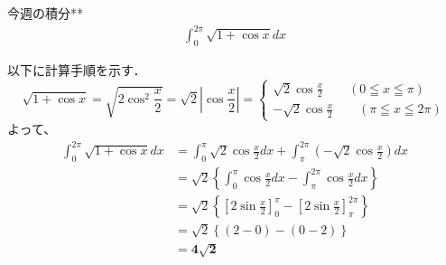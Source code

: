 \documentclass[main]{subfiles}
\begin{document}

\begin{mondai}{2}{今週の積分}{**}
    \begin{align*}
        \int_0^{2\pi} \sqrt{1+\cos x} dx
    \end{align*}
\end{mondai}


\solutionhead
\hfill
以下に計算手順を示す．
\hfill\
\begin{equation*}
    \sqrt{1+\cos x} = \sqrt{2\cos ^2 \frac{x}{2}} = \sqrt{2}\left| \cos \frac{x}{2} \right| = 
    \begin{cases}
        \sqrt{2} \cos \frac{x}{2} \qquad (0\leqq x \leqq \pi)\\
        -\sqrt{2} \cos \frac{x}{2} \qquad (\pi\leqq x \leqq 2\pi)
    \end{cases}
\end{equation*}
よって、
\begin{align*}
    \int ^{2\pi}_0 \sqrt{1+\cos x} dx
        &= \int^\pi_0 \sqrt{2} \cos \frac{x}{2}dx + \int^{2\pi}_\pi \left(-\sqrt{2} \cos \frac{x}{2}\right)dx \\
        &= \sqrt{2} \left\{\int^\pi_0 \cos \frac{x}{2}dx - \int^{2\pi}_\pi \cos \frac{x}{2}dx \right\} \\
        &= \sqrt{2} \left\{ \left[ 2\sin \frac{x}{2} \right]^\pi_0 - \left[ 2\sin \frac{x}{2} \right]^{2\pi}_\pi \right\} \\
        &= \sqrt{2} \left\{ (2-0) - (0-2) \right\} \\
        &= \boldsymbol{4 \sqrt{2}}
\end{align*}
\end{document}
